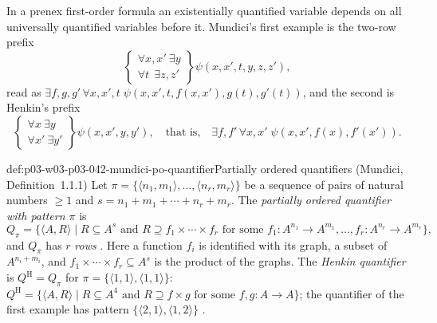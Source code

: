 In a prenex first-order formula an existentially quantified variable
depends on all universally quantified variables before it.  Mundici's
first example \cite[p.~212]{Mundici1985OtherQuantifiers} is the two-row
prefix
\[
 \begin{Bmatrix}\forall x,x'\ \exists y\\ \forall t\ \ \exists z,z'
 \end{Bmatrix}\psi(x,x',t,y,z,z'),
\]
read as \(\exists f,g,g'\,\forall x,x',t\;\psi(x,x',t,f(x,x'),g(t),
g'(t))\), and the second is Henkin's prefix
\[
 \begin{Bmatrix}\forall x\ \exists y\\ \forall x'\ \exists y'
 \end{Bmatrix}\psi(x,x',y,y'),\quad\text{that is,}\quad
 \exists f,f'\,\forall x,x'\;\psi(x,x',f(x),f'(x')).
\]

\begin{hbdefinition}{def:p03-w03-p03-042-mundici-po-quantifier}{Partially ordered quantifiers (Mundici, Definition~1.1.1)}
Let \(\pi=\{\langle n_1,m_1\rangle,\ldots,\langle n_r,m_r\rangle\}\) be a
sequence of pairs of natural numbers \(\geq1\) and
\(s=n_1+m_1+\cdots+n_r+m_r\).  The \emph{partially ordered quantifier with
pattern \(\pi\)} is
\[
 Q_\pi=\{\langle A,R\rangle\mid R\subseteq A^s\text{ and }R\supseteq
 f_1\times\cdots\times f_r\text{ for some }f_1:A^{n_1}\to A^{m_1},\ldots,
 f_r:A^{n_r}\to A^{m_r}\},
\]
and \(Q_\pi\) has \(r\) \emph{rows} \cite[p.~212]{Mundici1985OtherQuantifiers}.
Here a function \(f_i\) is identified with its graph, a subset of
\(A^{n_i+m_i}\), and \(f_1\times\cdots\times f_r\subseteq A^s\) is the
product of the graphs.  The \emph{Henkin quantifier} is
\(Q^{\mathrm H}=Q_\pi\) for \(\pi=\{\langle1,1\rangle,\langle1,1\rangle\}\):
\(Q^{\mathrm H}=\{\langle A,R\rangle\mid R\subseteq A^4\text{ and }R\supseteq
f\times g\text{ for some }f,g:A\to A\}\); the quantifier of the first
example has pattern \(\{\langle2,1\rangle,\langle1,2\rangle\}\)
\cite[p.~212]{Mundici1985OtherQuantifiers}.
\end{hbdefinition}

